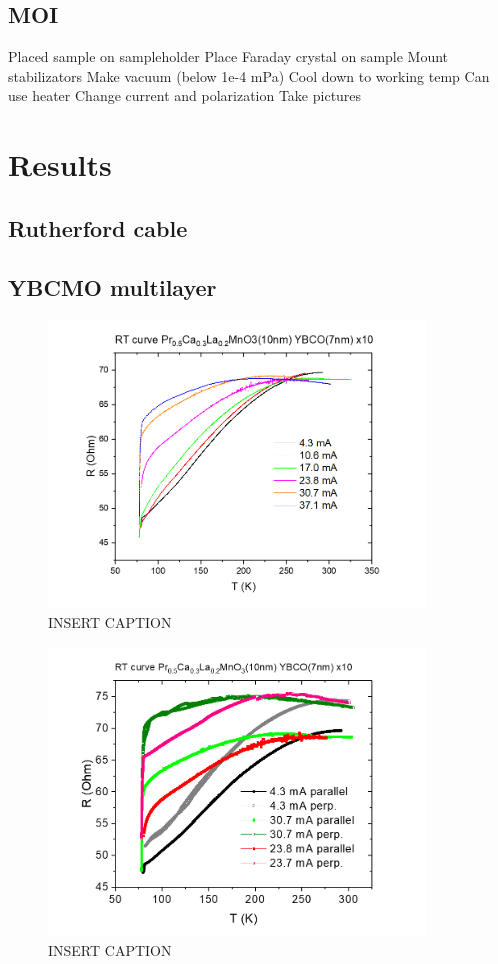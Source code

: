 \documentclass{comjnl}
\begin{document}
\subsection{MOI}
Placed sample on sampleholder
Place Faraday crystal on sample
Mount stabilizators
Make vacuum (below 1e-4 mPa)
Cool down to working temp
Can use heater 
Change current and polarization
Take pictures


\section{Results}  \label{Sec:Results}
\subsection{Rutherford cable}


\subsection{YBCMO multilayer}
\begin{figure}[h]
\centering
\includegraphics[width=100mm]{Bilde1.png}
\caption{INSERT CAPTION \label{fig:MOI}}
\end{figure}

\begin{figure}[h]
\centering
\includegraphics[width=100mm]{Bilde2.png}
\caption{INSERT CAPTION \label{fig:MOI}}
\end{figure}
\end{document}
